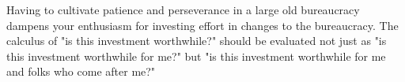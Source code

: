 Having to cultivate patience and perseverance in a large old bureaucracy dampens your enthusiasm for investing effort in changes to the bureaucracy. The calculus of "is this investment worthwhile?" should be evaluated not just as "is this investment worthwhile for me?" but "is this investment worthwhile for me and folks who come after me?"